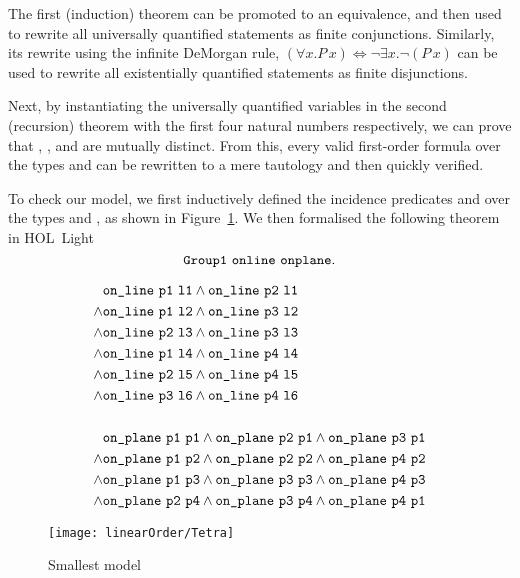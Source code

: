 The first (induction) theorem can be promoted to an equivalence, and then used to rewrite all universally quantified statements as finite conjunctions. Similarly, its rewrite using the infinite DeMorgan rule, $(\forall x. P\,x) \iff \neg\exists x. \neg (P\,x)$ can be used to rewrite all existentially quantified statements as finite disjunctions.

Next, by instantiating the universally quantified variables in the second (recursion) theorem with the first four natural numbers respectively, we can prove that , ,  and  are mutually distinct. From this, every valid first-order formula over the types  and  can be rewritten to a mere tautology and then quickly verified.

To check our model, we first inductively defined the incidence predicates  and  over the types  and , as shown in Figure~\ref{fig:SmallestModel}. We then formalised the following theorem in HOL~Light 
\begin{displaymath}
\code{Group1}\ \code{online}\ \code{onplane}.
\end{displaymath}

\begin{figure}
\begin{minipage}[c]{4cm}
\begin{align*}
& \texttt{on\_line}\ \texttt{p1}\ \texttt{l1}\wedge \texttt{on\_line}\ \texttt{p2}\ \texttt{l1}\\
\wedge & \texttt{on\_line}\ \texttt{p1}\ \texttt{l2}\wedge \texttt{on\_line}\ \texttt{p3}\ \texttt{l2}\\
\wedge & \texttt{on\_line}\ \texttt{p2}\ \texttt{l3}\wedge \texttt{on\_line}\ \texttt{p3}\ \texttt{l3}\\
\wedge & \texttt{on\_line}\ \texttt{p1}\ \texttt{l4}\wedge \texttt{on\_line}\ \texttt{p4}\ \texttt{l4}\\
\wedge & \texttt{on\_line}\ \texttt{p2}\ \texttt{l5}\wedge \texttt{on\_line}\ \texttt{p4}\ \texttt{l5}\\
\wedge & \texttt{on\_line}\ \texttt{p3}\ \texttt{l6}\wedge \texttt{on\_line}\ \texttt{p4}\ \texttt{l6}\\
\\
& \texttt{on\_plane}\ \texttt{p1}\ \texttt{p1}\wedge \texttt{on\_plane}\ \texttt{p2}\ \texttt{p1}\wedge \texttt{on\_plane}\ \texttt{p3}\ \texttt{p1}\\
\wedge & \texttt{on\_plane}\ \texttt{p1}\ \texttt{p2}\wedge \texttt{on\_plane}\ \texttt{p2}\ \texttt{p2}\wedge \texttt{on\_plane}\ \texttt{p4}\ \texttt{p2}\\
\wedge & \texttt{on\_plane}\ \texttt{p1}\ \texttt{p3}\wedge \texttt{on\_plane}\ \texttt{p3}\ \texttt{p3}\wedge \texttt{on\_plane}\ \texttt{p4}\ \texttt{p3}\\
\wedge & \texttt{on\_plane}\ \texttt{p2}\ \texttt{p4}\wedge \texttt{on\_plane}\ \texttt{p3}\ \texttt{p4}\wedge \texttt{on\_plane}\ \texttt{p4}\ \texttt{p1}
\end{align*}\end{minipage}\centering\texttt{[image: linearOrder/Tetra]}
\caption{Smallest model}\label{fig:SmallestModel}
\end{figure}

